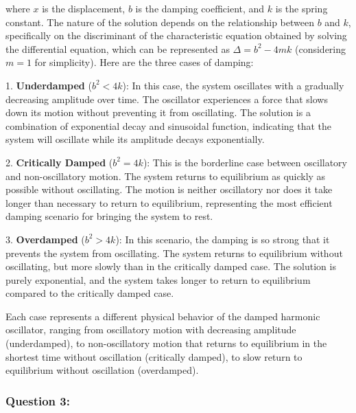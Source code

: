 \documentclass[a4paper,11pt]{article}
\begin{document}
where \(x\) is the displacement, \(b\) is the damping coefficient, and \(k\) is the spring constant. The nature of the solution depends on the relationship between \(b\) and \(k\), specifically on the discriminant of the characteristic equation obtained by solving the differential equation, which can be represented as \(\Delta = b^2 - 4mk\) (considering \(m=1\) for simplicity). Here are the three cases of damping:

1. \textbf{Underdamped} (\(b^2 < 4k\)): In this case, the system oscillates with a gradually decreasing amplitude over time. The oscillator experiences a force that slows down its motion without preventing it from oscillating. The solution is a combination of exponential decay and sinusoidal function, indicating that the system will oscillate while its amplitude decays exponentially.

2. \textbf{Critically Damped} (\(b^2 = 4k\)): This is the borderline case between oscillatory and non-oscillatory motion. The system returns to equilibrium as quickly as possible without oscillating. The motion is neither oscillatory nor does it take longer than necessary to return to equilibrium, representing the most efficient damping scenario for bringing the system to rest.

3. \textbf{Overdamped} (\(b^2 > 4k\)): In this scenario, the damping is so strong that it prevents the system from oscillating. The system returns to equilibrium without oscillating, but more slowly than in the critically damped case. The solution is purely exponential, and the system takes longer to return to equilibrium compared to the critically damped case.

Each case represents a different physical behavior of the damped harmonic oscillator, ranging from oscillatory motion with decreasing amplitude (underdamped), to non-oscillatory motion that returns to equilibrium in the shortest time without oscillation (critically damped), to slow return to equilibrium without oscillation (overdamped).

\subsubsection*{Question 3:}
\end{document}

